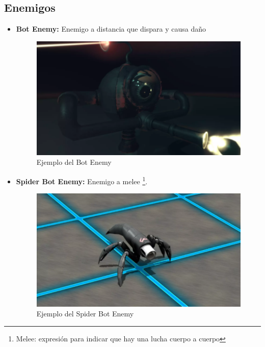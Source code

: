 \subsection{Enemigos}

\begin{itemize}
	\item \textbf{Bot Enemy:} Enemigo a distancia que dispara y causa daño
	\begin{figure}[H]
		\centering
		\includegraphics[scale=0.60]{imagenes/BotEnemy.png}
		\caption{\label{fig:BotEnemy}Ejemplo del Bot Enemy}
	\end{figure}
	\item \textbf{Spider Bot Enemy:} Enemigo a melee \footnote{Melee: expresión para indicar que hay una lucha cuerpo a cuerpo}.

	\begin{figure}[H]
		\centering
		\includegraphics[scale=0.60]{imagenes/SpiderBotEnemy.png}
		\caption{\label{fig:SpiderBotEnemy}Ejemplo del Spider Bot Enemy}
	\end{figure}
\end{itemize}



